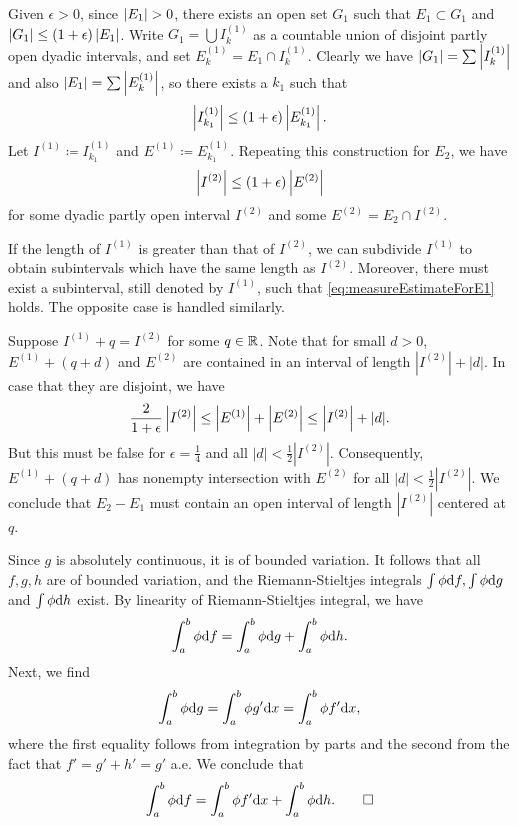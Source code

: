  
\begin{exercise}{7.4}
  Given $\epsilon > 0$, since $\left\vert E_1\right\vert > 0$,
  there exists an open set $G_1$ such that
  $E_1 \subset G_1$ and $\left\vert G_1\right\vert \le (1 + \epsilon) \left\vert E_1\right\vert$.
  Write $G_1 = \bigcup I^{(1)}_k$ as a countable union of
  disjoint partly open dyadic intervals,
  and set $E^{(1)}_k = E_1 \cap I^{(1)}_k$.
  Clearly we have
  $\left\vert G_1\right\vert = \sum \left\vert I^{(1)}_k\right\vert$ and
  also $\left\vert E_1\right\vert = \sum \left\vert E^{(1)}_k\right\vert$,
  so there exists a $k_1$ such that
  \begin{equation}
    \left\vert I^{(1)}_{k_1}\right\vert \le (1 + \epsilon) \left\vert E^{(1)}_{k_1}\right\vert.
    \label{eq:measureEstimateForE1}
  \end{equation}
  Let $I^{(1)} \coloneqq I^{(1)}_{k_1}$ and $E^{(1)} \coloneqq E^{(1)}_{k_1}$.
  Repeating this construction for $E_2$, we have
  \[
    \left\vert I^{(2)}\right\vert \le (1 + \epsilon) \left\vert E^{(2)}\right\vert
  \]
  for some dyadic partly open interval $I^{(2)}$
  and some $E^{(2)} = E_2 \cap I^{(2)}$.

  If the length of $I^{(1)}$ is greater than that of $I^{(2)}$,
  we can subdivide $I^{(1)}$ to obtain
  subintervals which have the same length as $I^{(2)}$.
  Moreover,
  there must exist a subinterval, still denoted by $I^{(1)}$,
  such that \eqref{eq:measureEstimateForE1} holds.
  The opposite case is handled similarly.

  Suppose $I^{(1)} + q = I^{(2)}$ for some $q \in \mathbb{R}$.
  Note that for small $d > 0$,
  $E^{(1)} + (q+d)$ and $E^{(2)}$ are contained in
  an interval of length $|I^{(2)}| + |d|$.
  In case that they are disjoint, we have
  \[
    \frac{2}{1 + \epsilon} \left\vert I^{(2)}\right\vert \le
    \left\vert E^{(1)}\right\vert + \left\vert E^{(2)}\right\vert \le \left\vert I^{(2)}\right\vert + |d|.
  \]
  But this must be false for $\epsilon = \frac{1}{4}$
  and all $|d| < \frac{1}{2} |I^{(2)}|$.
  Consequently, $E^{(1)} + (q+d)$ has nonempty intersection with $E^{(2)}$
  for all $|d| < \frac{1}{2}|I^{(2)}|$.
  We conclude that $E_2 - E_1$ must contain an open interval
  of length $|I^{(2)}|$ centered at $q$.
\end{exercise}

\begin{exercise}{7.5}
  Since $g$ is absolutely continuous,
  it is of bounded variation.
  It follows that all $f, g, h$ are of bounded variation,
  and the Riemann-Stieltjes integrals
  $\int \phi \mathrm{d} f, \int \phi \mathrm{d} g$ and $\int \phi \mathrm{d} h$ exist.
  By linearity of Riemann-Stieltjes integral, we have
  \[
    \int_a^b \phi \mathrm{d} f = \int_a^b \phi \mathrm{d} g + \int_a^b \phi \mathrm{d} h.
  \]
  Next, we find
  \[
    \int_a^b \phi \mathrm{d} g = \int_a^b \phi g' \mathrm{d} x
    = \int_a^b \phi f' \mathrm{d} x,
  \]
  where the first equality follows from integration by parts
  and the second from the fact that $f' = g' + h' = g'$ a.e.
  We conclude that
  \[
    \int_a^b \phi \mathrm{d} f = \int_a^b \phi f' \mathrm{d} x + \int_a^b \phi \mathrm{d} h.
    \qedhere
  \]
\end{exercise}

